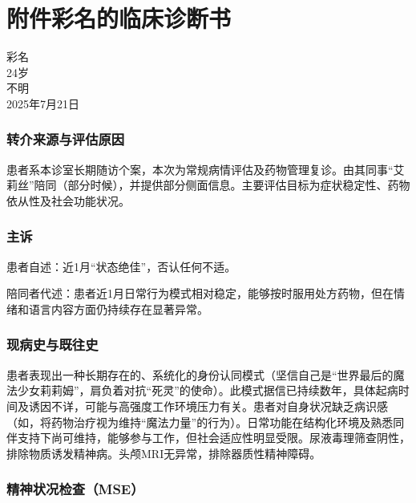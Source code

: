 \chapter*{附件\fullspace 彩名的临床诊断书}

\noindent%
 彩名\\
 24岁\\
 不明\\
 2025年7月21日

\halfline%
\subsection*{转介来源与评估原因}

患者系本诊室长期随访个案，本次为常规病情评估及药物管理复诊。由其同事“艾莉丝”陪同（部分时候），并提供部分侧面信息。主要评估目标为症状稳定性、药物依从性及社会功能状况。

\subsection*{主诉}

患者自述：近1月“状态绝佳”，否认任何不适。

陪同者代述：患者近1月日常行为模式相对稳定，能够按时服用处方药物，但在情绪和语言内容方面仍持续存在显著异常。

\subsection*{现病史与既往史}

患者表现出一种长期存在的、系统化的身份认同模式（坚信自己是“世界最后的魔法少女莉莉姆”，肩负着对抗“死灵”的使命）。此模式据信已持续数年，具体起病时间及诱因不详，可能与高强度工作环境压力有关。患者对自身状况缺乏病识感（如，将药物治疗视为维持“魔法力量”的行为）。日常功能在结构化环境及熟悉同伴支持下尚可维持，能够参与工作，但社会适应性明显受限。尿液毒理筛查阴性，排除物质诱发精神病。头颅MRI无异常，排除器质性精神障碍。

\subsection*{精神状况检查（MSE）}

